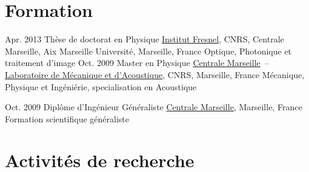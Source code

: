 \documentclass{cv}
\begin{document}

\section{Formation}

\begin{entrylist}
\entry
{Apr. 2013}
{Thèse de doctorat {\normalfont en Physique}}
{\href{http://www.fresnel.fr/spip/}{Institut Fresnel}, CNRS, Centrale Marseille, Aix Marseille Universit\'e, Marseille, France}
{Optique, Photonique et traitement d'image}
\entry
{Oct. 2009}
{Master {\normalfont en Physique}}
{\href{http://www.centrale-marseille.fr/}{Centrale Marseille}~--~
\href{http://www.lma.cnrs-mrs.fr/}{Laboratoire de Mécanique et d'Acoustique}, CNRS, Marseille, France}
{Mécanique, Physique et Ingéniérie, specialisation en Acoustique}

\entry
{Oct. 2009}
{Diplôme d'{Ingénieur Généraliste}}
{\href{http://www.centrale-marseille.fr/}{Centrale Marseille}, Marseille, France}
{Formation scientifique généraliste}
\end{entrylist}


\vspace*{-0.2cm}
\section{Activités de recherche}
\end{document}
